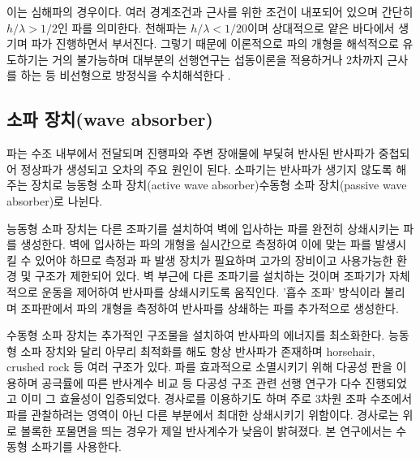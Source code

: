 이는 심해파의 경우이다. 여러 경계조건과 근사를 위한 조건이 내포되어 있으며 간단히 $h/\lambda > 1/2$인 파를 의미한다. 천해파는 $h/\lambda < 1/20$이며 상대적으로 얕은 바다에서 생기며 파가 진행하면서 부서진다. 그렇기 때문에 이론적으로 파의 개형을 해석적으로 유도하기는 거의 불가능하며 대부분의 선행연구는 섭동이론을 적용하거나 2차까지 근사를 하는 등 비선형으로 방정식을 수치해석한다 \cite{society1993laboratory}. 

\subsection{소파 장치(wave absorber)}
파는 수조 내부에서 전달되며 진행파와 주변 장애물에 부딫혀 반사된 반사파가 중첩되어 정상파가 생성되고 오차의 주요 원인이 된다. 소파기는 반사파가 생기지 않도록 해주는 장치로 능동형 소파 장치(active wave absorber)\와 수동형 소파 장치(passive wave absorber)로 나뉜다\cite{ouellet1986survey}.


능동형 소파 장치는 다른 조파기를 설치하여 벽에 입사하는 파를 완전히 상쇄시키는 파를 생성한다. 벽에 입사하는 파의 개형을 실시간으로 측정하여 이에 맞는 파를 발생시킬 수 있어야 하므로 측정과 파 발생 장치가 필요하며 고가의 장비이고 사용가능한 환경 및 구조가 제한되어 있다. 벽 부근에 다른 조파기를 설치하는 것이며 조파기가 자체적으로 운동을 제어하여 반사파를 상쇄시키도록 움직인다. '흡수 조파' 방식이라 불리며 조파판에서 파의 개형을 측정하여 반사파를 상쇄하는 파를 추가적으로 생성한다.


수동형 소파 장치는 추가적인 구조물을 설치하여 반사파의 에너지를 최소화한다. 능동형 소파 장치와 달리 아무리 최적화를 해도 항상 반사파가 존재하며 horsehair, crushed rock 등 여러 구조가 있다. 파를 효과적으로 소멸시키기 위해 다공성 판을 이용하며 공극률에 따른 반사계수 비교 등 다공성 구조 관련 선행 연구가 다수 진행되었고 이미 그 효율성이 입증되었다\cite{lim2014optimum,o2017methods}. 경사로를 이용하기도 하며 주로 3차원 조파 수조에서 파를 관찰하려는 영역이 아닌 다른 부분에서 최대한 상쇄시키기 위함이다. 경사로는 위로 볼록한 포물면을 띄는 경우가 제일 반사계수가 낮음이 밝혀졌다. 본 연구에서는 수동형 소파기를 사용한다.

